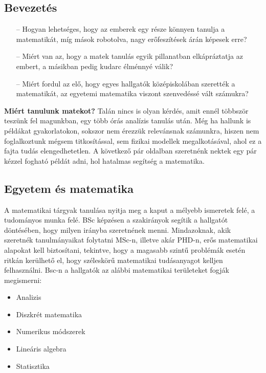 \documentclass[../Main.tex]{subfiles}
\begin{document}
\subsection{Bevezetés}

\begin{itemize}
    \item[--] Hogyan lehetséges, hogy az emberek egy része könnyen tanulja a matematikát, míg
mások robotolva, nagy erőfeszítések árán képesek erre?
    \item[--] Miért van az, hogy a matek tanulás egyik pillanatban elkápráztatja az embert, a
másikban pedig kudarc élménnyé válik?
    \item[--] Miért fordul az elő, hogy egyes hallgatók középiskolában szerették a matematikát, az
egyetemi matematika viszont szenvedéssé vált számukra?
\end{itemize}

\begin{flushleft}

\textbf{Miért tanulunk matekot?} Talán nincs is olyan kérdés, amit ennél többször teszünk fel magunkban,
egy több órás analízis tanulás után. Még ha hallunk
is példákat gyakorlatokon, sokszor nem érezzük relevánsnak számunkra,
hiszen nem foglalkoztunk mégsem titkosítással, sem fizikai modellek megalkotásával,
ahol ez a fajta tudás elengedhetetlen. A következő pár oldalban szeretnénk nektek 
egy pár kézzel fogható példát adni, hol hatalmas segítség a matematika. 

\end{flushleft}

\subsection{Egyetem és matematika}

\begin{flushleft}
A matematikai tárgyak tanulása nyitja meg a kaput a mélyebb ismeretek felé, a tudományos munka felé.
BSc képzésen a szakirányok segítik a hallgatót döntésében, hogy milyen irányba szeretnének menni.
Mindazoknak, akik szeretnék tanulmányaikat folytatni MSc-n, illetve akár PHD-n,
erős matematikai alapokat kell biztosítani, tekintve, hogy a magasabb szintű problémák esetén ritkán kerülhető el,
hogy széleskörű matematikai tudásanyagot kelljen felhasználni. Bsc-n a hallgatók az alábbi 
matematikai területeket fogják megismerni:

\begin{itemize}
    \item Analizis
    \item Diszkrét matematika
    \item Numerikus módszerek
    \item Lineáris algebra
    \item Statisztika
\end{itemize}

\end{flushleft}
\end{document}
